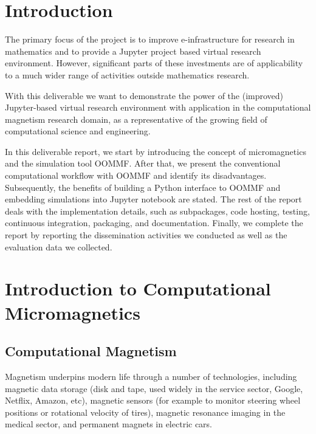 \documentclass{deliverablereport}
\author{Marijan Beg and Hans Fangohr}
\begin{document}
\maketitle
\githubissuedescription
\newpage
\tableofcontents
\newpage

\section{Introduction}
The primary focus of the \ODK project is to improve e-infrastructure
for research in mathematics and to provide a Jupyter project based
virtual research environment. However, significant parts of these
investments are of applicability to a much wider range of activities
outside mathematics research.

With this deliverable we want to demonstrate the power of the
(improved) Jupyter-based virtual research environment with application
in the computational magnetism research domain, as a representative of
the growing field of computational science and engineering.

In this deliverable report, we start by introducing the concept of
micromagnetics and the simulation tool OOMMF. After that, we present
the conventional computational workflow with OOMMF and identify its
disadvantages. Subsequently, the benefits of building a Python
interface to OOMMF and embedding simulations into Jupyter notebook are
stated. The rest of the report deals with the implementation details,
such as subpackages, code hosting, testing, continuous integration,
packaging, and documentation. Finally, we complete the report by
reporting the dissemination activities we conducted as well as the
evaluation data we collected.

\section{Introduction to Computational Micromagnetics}
\subsection{Computational Magnetism}

Magnetism underpins modern life through a number of technologies,
including magnetic data storage (disk and tape, used widely in the
service sector, Google, Netflix, Amazon, etc), magnetic sensors (for
example to monitor steering wheel positions or rotational velocity of
tires), magnetic resonance imaging in the medical sector, and
permanent magnets in electric cars.
\end{document}
